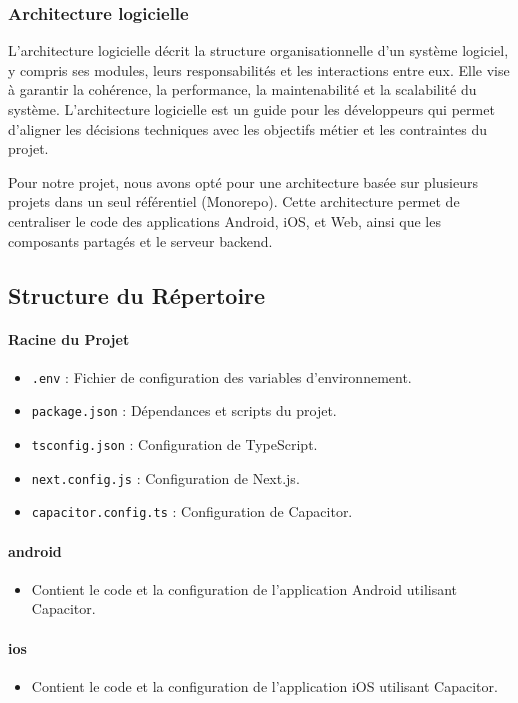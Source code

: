 \subsubsection{Architecture logicielle}
L’architecture logicielle décrit la structure organisationnelle d’un système
logiciel, y compris ses modules, leurs responsabilités et les interactions
entre eux. Elle vise à garantir la cohérence, la performance, la maintenabilité
et la scalabilité du système. L’architecture logicielle est un guide pour les
développeurs qui permet d’aligner les décisions techniques avec les objectifs
métier et les contraintes du projet.

Pour notre projet, nous avons opté pour une architecture basée sur plusieurs
projets dans un seul référentiel (Monorepo). Cette architecture permet de centraliser
le code des applications Android, iOS, et Web, ainsi que les composants partagés et le serveur backend.

\subsection*{Structure du Répertoire}

\paragraph{Racine du Projet}
\begin{itemize}
    \item \texttt{.env} : Fichier de configuration des variables d'environnement.
    \item \texttt{package.json} : Dépendances et scripts du projet.
    \item \texttt{tsconfig.json} : Configuration de TypeScript.
    \item \texttt{next.config.js} : Configuration de Next.js.
    \item \texttt{capacitor.config.ts} : Configuration de Capacitor.
\end{itemize}

\paragraph{android}
\begin{itemize}
    \item Contient le code et la configuration de l'application Android utilisant Capacitor.
\end{itemize}

\paragraph{ios}
\begin{itemize}
    \item Contient le code et la configuration de l'application iOS utilisant Capacitor.
\end{itemize}

